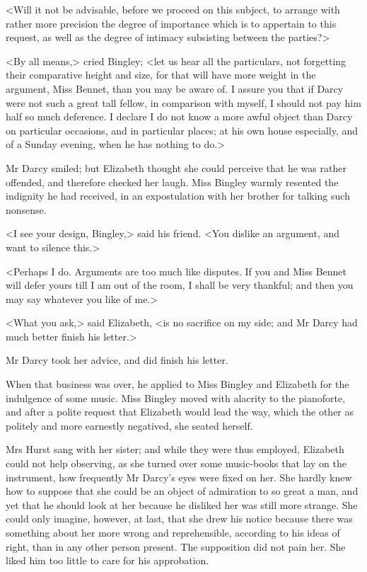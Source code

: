 <Will it not be advisable, before we proceed on this subject, to arrange with rather more precision the degree of importance which is to appertain to this request, as well as the degree of intimacy subsisting between the parties?>

<By all means,> cried Bingley; <let us hear all the particulars, not forgetting their comparative height and size, for that will have more weight in the argument, Miss Bennet, than you may be aware of. I assure you that if Darcy were not such a great tall fellow, in comparison with myself, I should not pay him half so much deference. I declare I do not know a more awful object than Darcy on particular occasions, and in particular places; at his own house especially, and of a Sunday evening, when he has nothing to do.>

Mr Darcy smiled; but Elizabeth thought she could perceive that he was rather offended, and therefore checked her laugh. Miss Bingley warmly resented the indignity he had received, in an expostulation with her brother for talking such nonsense.

<I see your design, Bingley,> said his friend. <You dislike an argument, and want to silence this.>

<Perhaps I do. Arguments are too much like disputes. If you and Miss Bennet will defer yours till I am out of the room, I shall be very thankful; and then you may say whatever you like of me.>

<What you ask,> said Elizabeth, <is no sacrifice on my side; and Mr Darcy had much better finish his letter.>

Mr Darcy took her advice, and did finish his letter.

When that business was over, he applied to Miss Bingley and Elizabeth for the indulgence of some music. Miss Bingley moved with alacrity to the pianoforte, and after a polite request that Elizabeth would lead the way, which the other as politely and more earnestly negatived, she seated herself.

Mrs Hurst sang with her sister; and while they were thus employed, Elizabeth could not help observing, as she turned over some music-books that lay on the instrument, how frequently Mr Darcy's eyes were fixed on her. She hardly knew how to suppose that she could be an object of admiration to so great a man, and yet that he should look at her because he disliked her was still more strange. She could only imagine, however, at last, that she drew his notice because there was something about her more wrong and reprehensible, according to his ideas of right, than in any other person present. The supposition did not pain her. She liked him too little to care for his approbation.

